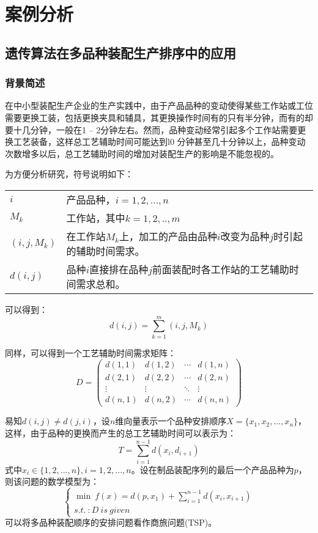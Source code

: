 \chapter{案例分析}
\section{遗传算法在多品种装配生产排序中的应用}
\subsection{背景简述}
在中小型装配生产企业的生产实践中，由于产品品种的变动使得某些工作站或工位需要更换工装，包括更换夹具和辅具，其更换操作时间有的只有半分钟，而有的却要十几分钟，一般在1 -- 2分钟左右。然而，品种变动经常引起多个工作站需要更换工艺装备，这样总工艺辅助时间可能达到l0 分钟甚至几十分钟以上，品种变动次数增多以后，总工艺辅助时间的增加对装配生产的影响是不能忽视的。

为方便分析研究，符号说明如下：

\begin{tabular}{ll}
$i$ & 产品品种，$i = 1,2,...,n$\\
$M_k$ & 工作站，其中$k = 1,2,..,m$\\
$(i,j,M_k)$ & 在工作站$M_k$上，加工的产品由品种$i$改变为品种$j$时引起的辅助时间需求。\\
$d(i,j)$ & 品种$i$直接排在品种$j$前面装配时各工作站的工艺辅助时间需求总和。
\end{tabular}

可以得到：
\begin{equation}
d(i,j) = \sum_{k=1}^m (i,j,M_k) \label{equ:3}
\end{equation}

同样，可以得到一个工艺辅助时间需求矩阵：
\begin{equation}
D = \begin{pmatrix}
d(1,1) & d(1,2) & \cdots & d(1,n)\\
d(2,1) & d(2,2) & \cdots & d(2,n)\\
\vdots & \vdots & \ddots & \vdots\\
d(n,1) & d(n,2) & \cdots & d(n,n)
\end{pmatrix}
\end{equation}

易知$d(i,j) \neq d(j,i)$，设$n$维向量表示一个品种安排顺序$X = \{x_1,x_2,...,x_n\}$，这样，由于品种的更换而产生的总工艺辅助时间可以表示为：
\begin{equation}
T = \sum_{i = 1}^{n-1} d(x_i,d_{i+1})
\end{equation}
式中$x_i \in \{1,2,...,n\}, i = 1,2,...,n$。设在制品装配序列的最后一个产品品种为$p$，则该问题的数学模型为：
\begin{equation}
\begin{cases}
\min \  f(x) = d(p,x_1) + \displaystyle\sum_{i = 1}^{n-1} d(x_i,x_{i+1})\\
s.t.\ : D\ is\ given
\end{cases}
\end{equation}
可以将多品种装配顺序的安排问题看作商旅问题(TSP)。

